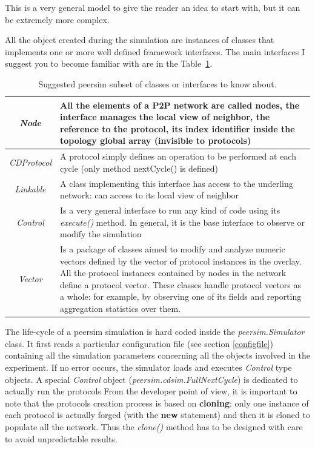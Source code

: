 \documentclass[a4paper,11pt]{article}
\begin{document}
This is a very general model to give the reader an idea to start with,
but it can be extremely more complex. 

All the object created during the simulation are instances of classes
that implements one or more well defined framework interfaces. The
main interfaces I suggest you to become familiar with are in the
Table~\ref{t:psim_classes}.


\label{table1}
\begin{table}
\begin{center}\begin{tabular}{|c|p{2.5in}|}
\hline 
\emph{Node}&
All the elements of a P2P network are called nodes, the interface
manages the local view of neighbor, the reference to the protocol,
its index identifier inside the topology global array (invisible to
protocols)\\
\hline 
\emph{CDProtocol}&
A protocol simply defines an operation to be performed at each cycle
(only method nextCycle() is defined)\\
\hline 
\emph{Linkable}&
A class implementing this interface has access to the underling network:
can access to its local view of neighbor\\
\hline 
\emph{Control}&
Is a very general interface to run any kind of code using its
\emph{execute()} method. In general, it is the base interface to observe or
modify the simulation\\
\hline
\emph{Vector}&
Is a package of classes aimed to modify and analyze numeric vectors
defined by the vector of protocol instances in the overlay. All the
protocol instances contained by nodes in the network define a protocol
vector. These classes handle protocol vectors as a whole: for example,
by observing one of its fields and reporting aggregation statistics
over them. \\
\hline
\end{tabular}\end{center}

\caption{\label{t:psim_classes}Suggested peersim subset of classes or
  interfaces to know about.} 
\end{table}


The life-cycle of a peersim simulation is hard coded inside the
\emph{peersim.Simulator} class. It first reads a particular
configuration file (see section 
\ref{configfile}) containing all the simulation parameters 
concerning all the
objects involved in the experiment. If no error occurs, the simulator
loads and executes \emph{Control} type objects. A special
\emph{Control} object (\emph{peersim.cdsim.FullNextCycle}) is
dedicated to actually run the protocols
From the developer point of view, it is important to note that the
protocols creation process is based on \textbf{cloning}: only one instance
of each protocol is actually forged (with the \textbf{new} statement)
and then it is cloned to populate all the network. Thus the 
\emph{clone()} method has to be designed with care to avoid 
unpredictable results.
\end{document}
